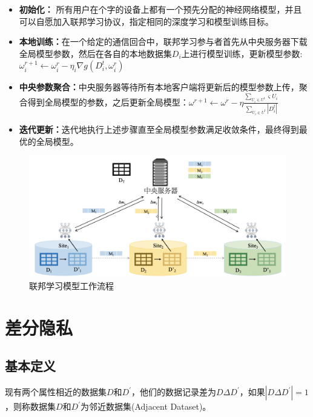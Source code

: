 \begin{itemize}
\item \textbf{初始化：}
所有用户在个字的设备上都有一个预先分配的神经网络模型，并且可以自愿加入联邦学习协议，指定相同的深度学习和模型训练目标。
\item  \textbf{本地训练：}在一个给定的通信回合中，联邦学习参与者首先从中央服务器下载全局模型参数，然后在各自的本地数据集$D_{i}$上进行模型训练，更新模型参数:$\omega_{i}^{r+1} \leftarrow \omega_{i}^{r}-\eta_{i} \nabla g\left(D_{i}^{t}, \omega_{i}^{r}\right)$
\item \textbf{中央参数聚合：}中央服务器等待所有本地客户端将更新后的模型参数上传，聚合得到全局模型的参数，之后更新全局模型：$\omega^{r+1} \leftarrow \omega^{r}-\eta \frac{\sum_{U_{i} \in U^{t}} \varsigma U_{i}}{\sum_{U_{i} \in U^{t}}\left|D_{i}^{t}\right|}$
\item \textbf{迭代更新：}迭代地执行上述步骤直至全局模型参数满足收敛条件，最终得到最优的全局模型。
\end{itemize}

\begin{figure}[!hbt]
\centering
	\includegraphics[scale=0.45]{fig2/C2/联邦学习模型流程}%
	\caption{联邦学习模型工作流程}
	\label{fig:联邦学习模型工作流程}	
\end{figure}

\section{差分隐私}
\subsection{基本定义}
\begin{define}[邻近数据集]\label{邻近数据集}
现有两个属性相近的数据集$D$和$D^{\prime}$，他们的数据记录差为$D \Delta D^{\prime}$，如果$\left|D \Delta D^{\prime}\right|=1$，则称数据集$D$和$D^{\prime}$为邻近数据集(Adjacent Dataset)。
\end{define}

